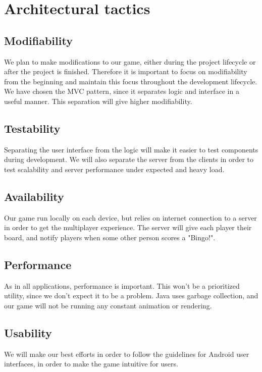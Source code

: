 \section{Architectural tactics}
\label{sec:architecturaltactics}

\subsection{Modifiability} 
We plan to make modifications to our game, either during the project lifecycle or after the project is finished. Therefore it is important to focus on modifiability from the beginning and maintain this focus throughout the development lifecycle. 
We have chosen the MVC pattern, since it separates logic and interface in a useful manner. This separation will give higher modifiability.

\subsection{Testability}
Separating the user interface from the logic will make it easier to test components during development. We will also separate the server from the clients in order to test scalability and server performance under expected and heavy load.


\subsection{Availability} 
Our game run locally on each device, but relies on internet connection to a server in order to get the multiplayer experience. The server will give each player their board, and notify players when some other person scores a "Bingo!". 


\subsection{Performance}
As in all applications, performance is important. This won't be a prioritized utility, since we don't expect it to be a problem. Java uses garbage collection, and our game will not be running any constant animation or rendering.



\subsection{Usability} 
We will make our best efforts in order to follow the guidelines for Android user interfaces, in order to make the game intuitive for users.